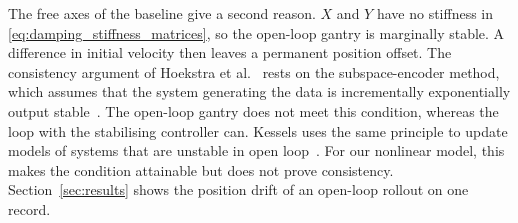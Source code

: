The free axes of the baseline give a second reason.
$X$ and $Y$ have no stiffness in \eqref{eq:damping_stiffness_matrices}, so the
open-loop gantry is marginally stable.
A difference in initial velocity then leaves a permanent position offset.
The consistency argument of Hoekstra et al.~\cite[Sec.~5.5]{hoekstra2026lfr}
rests on the subspace-encoder method, which assumes that the system
generating the data is incrementally exponentially output
stable~\cite[Cond.~1]{beintema2023subnet}.
The open-loop gantry does not meet this condition, whereas the loop with the
stabilising controller can.
Kessels uses the same principle to update models of systems that are unstable
in open loop~\cite[Ch.~5]{kessels2025ai}.
For our nonlinear model, this makes the condition attainable but does not
prove consistency.
Section~\ref{sec:results} shows the position drift of an open-loop rollout on
one record.

